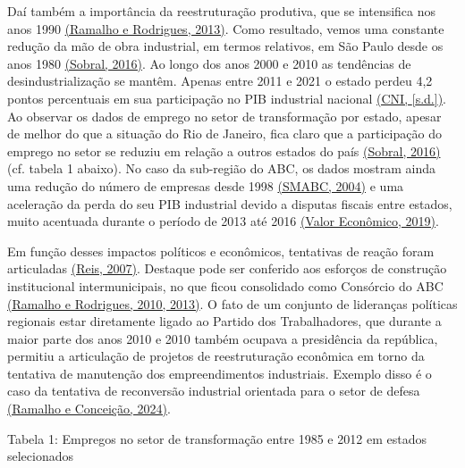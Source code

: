 Daí também a importância da reestruturação produtiva, que se intensifica
nos anos 1990 \href{https://www.zotero.org/google-docs/?DEVtfA}{(Ramalho
e Rodrigues, 2013)}. Como resultado, vemos uma constante redução da mão
de obra industrial, em termos relativos, em São Paulo desde os anos 1980
\href{https://www.zotero.org/google-docs/?O9uEV4}{(Sobral, 2016)}. Ao
longo dos anos 2000 e 2010 as tendências de desindustrialização se
mantêm. Apenas entre 2011 e 2021 o estado perdeu 4,2 pontos percentuais
em sua participação no PIB industrial nacional
\href{https://www.zotero.org/google-docs/?2YaMK0}{(CNI, {[}s.d.{]})}. Ao
observar os dados de emprego no setor de transformação por estado,
apesar de melhor do que a situação do Rio de Janeiro, fica claro que a
participação do emprego no setor se reduziu em relação a outros estados
do país \href{https://www.zotero.org/google-docs/?Xjf771}{(Sobral,
2016)} (cf. tabela 1 abaixo). No caso da sub-região do ABC, os dados
mostram ainda uma redução do número de empresas desde 1998
\href{https://www.zotero.org/google-docs/?D25gWL}{(SMABC, 2004)} e uma
aceleração da perda do seu PIB industrial devido a disputas fiscais
entre estados, muito acentuada durante o período de 2013 até 2016
\href{https://www.zotero.org/google-docs/?BrK8oO}{(Valor Econômico,
2019)}.

Em função desses impactos políticos e econômicos, tentativas de reação
foram articuladas
\href{https://www.zotero.org/google-docs/?rK1JZk}{(Reis, 2007)}.
Destaque pode ser conferido aos esforços de construção institucional
intermunicipais, no que ficou consolidado como Consórcio do ABC
\href{https://www.zotero.org/google-docs/?88O0x4}{(Ramalho e Rodrigues,
2010, 2013)}. O fato de um conjunto de lideranças políticas regionais
estar diretamente ligado ao Partido dos Trabalhadores, que durante a
maior parte dos anos 2010 e 2010 também ocupava a presidência da
república, permitiu a articulação de projetos de reestruturação
econômica em torno da tentativa de manutenção dos empreendimentos
industriais. Exemplo disso é o caso da tentativa de reconversão
industrial orientada para o setor de defesa
\href{https://www.zotero.org/google-docs/?2jRDZr}{(Ramalho e Conceição,
2024)}.

Tabela 1: Empregos no setor de transformação entre 1985 e 2012 em
estados selecionados

